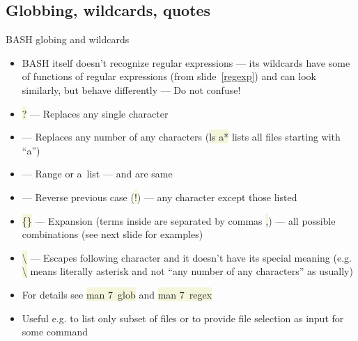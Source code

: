 \documentclass[compress, ucs, xelatex, 11pt, xcolor=svgnames, aspectratio=169,
	hyperref={
		bookmarks=true,
		unicode=true,
		colorlinks=true,
		pdftitle={Linux, command line and MetaCentrum},
		plainpages=false,
		pdfauthor={Vojtech Zeisek},
		pdfsubject={Course about use of Linux command line, writing shell scripts and using MetaCentrum of CESNET},
		pdfcreator={XeLaTeX},
		pdfkeywords={Linux, GNU, BASH, shell, command line, MetaCentrum},
		linkcolor=DarkRed, %
		anchorcolor=DarkBlue, %
		citecolor=Indigo, %
		filecolor=NavyBlue, %
		menucolor=DarkMagenta, %
		urlcolor=DarkBlue, %
		pdftex},
	url={hyphens, lowtilde} %
	]{beamer}
\renewcommand{\texttt}[1]{\colorbox{Beige}{{\ttfamily #1}}}
\begin{document}
\subsection{Globbing, wildcards, quotes}

\begin{frame}{BASH globing and wildcards}
	\label{globbing}
	\begin{itemize}
		\item BASH itself doesn't recognize regular expressions --- its wildcards have some of functions of regular expressions (from slide~\ref{regexp}) and can look similarly, but behave differently --- Do not confuse!
		\item \texttt{?} --- Replaces any single character
		\item \texttt{*} --- Replaces any number of any characters (\texttt{ls a*} lists all files starting with \enquote{a})
		\item \texttt{[]} --- Range or a~list --- \texttt{[abcdef]} and \texttt{[a-f]} are same
		\item \texttt{[!\ldots]} --- Reverse previous case (\texttt{!}) --- any character except those listed
		\item \texttt{\{\}} --- Expansion (terms inside are separated by commas \texttt{,}) --- all possible combinations (see next slide for examples)
		\item \texttt{\textbackslash} --- Escapes following character and it doesn't have its special meaning (e.g. \texttt{\textbackslash *} means literally asterisk \texttt{*} and not \enquote{any number of any characters} as usually)
		\item For details see \texttt{man 7~glob} and \texttt{man 7~regex}
		\item Useful e.g. to list only subset of files or to provide file selection as input for some command
	\end{itemize}
\end{frame}
\end{document}

